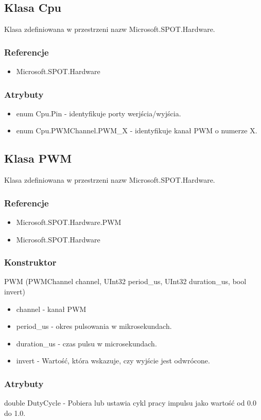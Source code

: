 \documentclass{article}
\begin{document}
\subsection{Klasa Cpu}
Klasa zdefiniowana w przestrzeni nazw Microsoft.SPOT.Hardware.
\subsubsection{Referencje}
\begin{itemize}
\item Microsoft.SPOT.Hardware
\end{itemize}
\subsubsection{Atrybuty}
\begin{itemize}
\item enum Cpu.Pin - identyfikuje porty werjścia/wyjścia.
\item enum Cpu.PWMChannel.PWM\_X - identyfikuje kanał PWM o numerze X.
\end{itemize}

\newpage
\subsection{Klasa PWM}
Klasa zdefiniowana w przestrzeni nazw Microsoft.SPOT.Hardware. 
\subsubsection{Referencje}
\begin{itemize}
\item Microsoft.SPOT.Hardware.PWM
\item Microsoft.SPOT.Hardware
\end{itemize}
\subsubsection{Konstruktor}
PWM (PWMChannel channel, UInt32 period\_us, UInt32 duration\_us,  bool invert)
\begin{itemize}
\item channel - kanał PWM
\item period\_us - okres pulsowania w mikrosekundach.
\item duration\_us - czas pulsu w microsekundach.
\item invert - Wartość, która wskazuje, czy wyjście jest odwrócone.
\end{itemize}
\subsubsection{Atrybuty}
double DutyCycle - Pobiera lub ustawia cykl pracy impulsu jako wartość od 0.0 do 1.0.
\end{document}
